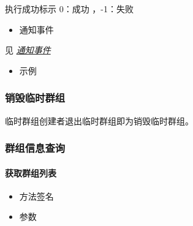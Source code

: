 \documentclass[letterpaper,10pt,english]{sphinxmanual}
\begin{document}
执行成功标示 0：成功 ，-1：失败
\begin{itemize}
\item {} 
通知事件

\end{itemize}

见 {\hyperref[\detokenize{csharp:groupEvent}]{\emph{通知事件}}}
\begin{itemize}
\item {} 
示例

\end{itemize}

%
\begin{sphinxVerbatim}[commandchars=\\\{\}]
   
\PYG{p}{[}\PYG{p}{]}   \PYG{p}{[}\PYG{p}{]}   
\end{sphinxVerbatim}


\subsubsection{销毁临时群组}
\label{\detokenize{csharp:id38}}
临时群组创建者退出临时群组即为销毁临时群组。


\subsubsection{群组信息查询}
\label{\detokenize{csharp:id39}}

\paragraph{获取群组列表}
\label{\detokenize{csharp:id40}}\begin{itemize}
\item {} 
方法签名

\end{itemize}

%
\begin{sphinxVerbatim}[commandchars=\\\{\}]
 \PYG{p}{[}\PYG{p}{]} 
\end{sphinxVerbatim}
\begin{itemize}
\item {} 
参数

\end{itemize}
\end{document}
